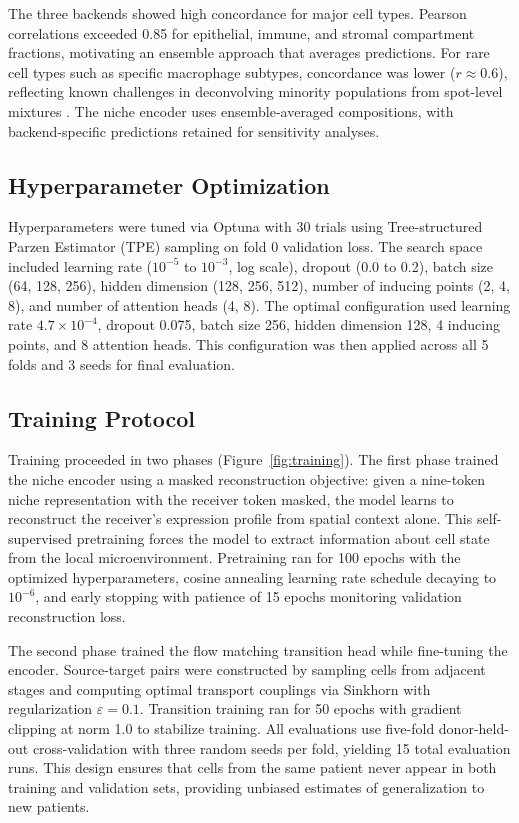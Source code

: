 \documentclass[conference]{IEEEtran}
\begin{document}
The three backends showed high concordance for major cell types. Pearson correlations exceeded 0.85 for epithelial, immune, and stromal compartment fractions, motivating an ensemble approach that averages predictions. For rare cell types such as specific macrophage subtypes, concordance was lower ($r \approx 0.6$), reflecting known challenges in deconvolving minority populations from spot-level mixtures \cite{Gaspard-Boulinc2025-la, Sun2026-sv, Li2022-uy}. The niche encoder uses ensemble-averaged compositions, with backend-specific predictions retained for sensitivity analyses.

\subsection{Hyperparameter Optimization}

Hyperparameters were tuned via Optuna with 30 trials using Tree-structured Parzen Estimator (TPE) sampling on fold 0 validation loss. The search space included learning rate ($10^{-5}$ to $10^{-3}$, log scale), dropout (0.0 to 0.2), batch size (64, 128, 256), hidden dimension (128, 256, 512), number of inducing points (2, 4, 8), and number of attention heads (4, 8). The optimal configuration used learning rate $4.7 \times 10^{-4}$, dropout 0.075, batch size 256, hidden dimension 128, 4 inducing points, and 8 attention heads. This configuration was then applied across all 5 folds and 3 seeds for final evaluation.

\subsection{Training Protocol}

Training proceeded in two phases (Figure~\ref{fig:training}). The first phase trained the niche encoder using a masked reconstruction objective: given a nine-token niche representation with the receiver token masked, the model learns to reconstruct the receiver's expression profile from spatial context alone. This self-supervised pretraining forces the model to extract information about cell state from the local microenvironment. Pretraining ran for 100 epochs with the optimized hyperparameters, cosine annealing learning rate schedule decaying to $10^{-6}$, and early stopping with patience of 15 epochs monitoring validation reconstruction loss.

The second phase trained the flow matching transition head while fine-tuning the encoder. Source-target pairs were constructed by sampling cells from adjacent stages and computing optimal transport couplings via Sinkhorn with regularization $\varepsilon = 0.1$. Transition training ran for 50 epochs with gradient clipping at norm 1.0 to stabilize training. All evaluations use five-fold donor-held-out cross-validation with three random seeds per fold, yielding 15 total evaluation runs. This design ensures that cells from the same patient never appear in both training and validation sets, providing unbiased estimates of generalization to new patients.
\end{document}
